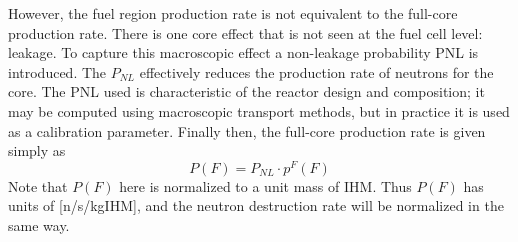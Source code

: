However, the fuel region production rate is not equivalent to the full-core production rate.  There is one 
core effect that is not seen at the fuel cell level: leakage.  To capture this macroscopic effect a 
non-leakage probability PNL is introduced.  The $P_{NL}$ effectively reduces the production rate of 
neutrons for the core. The PNL used is characteristic of the reactor design and composition; it may 
be computed using macroscopic transport methods, but in practice it is used as a calibration parameter.  
Finally then, the full-core production rate is given simply as 
\begin{equation}
\label{1g_P_F}
P(F) = P_{NL} \cdot p^F(F)
\end{equation}
Note that $P(F)$ here is normalized to a unit mass of IHM.  Thus $P(F)$ has units of [n/s/kgIHM], 
and the neutron destruction rate will be normalized in the same way.



